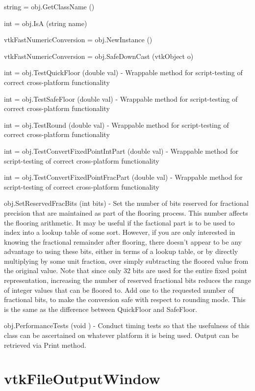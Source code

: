 \begin{DoxyItemize}
\item {\ttfamily string = obj.\-Get\-Class\-Name ()}  
\item {\ttfamily int = obj.\-Is\-A (string name)}  
\item {\ttfamily vtk\-Fast\-Numeric\-Conversion = obj.\-New\-Instance ()}  
\item {\ttfamily vtk\-Fast\-Numeric\-Conversion = obj.\-Safe\-Down\-Cast (vtk\-Object o)}  
\item {\ttfamily int = obj.\-Test\-Quick\-Floor (double val)} -\/ Wrappable method for script-\/testing of correct cross-\/platform functionality  
\item {\ttfamily int = obj.\-Test\-Safe\-Floor (double val)} -\/ Wrappable method for script-\/testing of correct cross-\/platform functionality  
\item {\ttfamily int = obj.\-Test\-Round (double val)} -\/ Wrappable method for script-\/testing of correct cross-\/platform functionality  
\item {\ttfamily int = obj.\-Test\-Convert\-Fixed\-Point\-Int\-Part (double val)} -\/ Wrappable method for script-\/testing of correct cross-\/platform functionality  
\item {\ttfamily int = obj.\-Test\-Convert\-Fixed\-Point\-Frac\-Part (double val)} -\/ Wrappable method for script-\/testing of correct cross-\/platform functionality  
\item {\ttfamily obj.\-Set\-Reserved\-Frac\-Bits (int bits)} -\/ Set the number of bits reserved for fractional precision that are maintained as part of the flooring process. This number affects the flooring arithmetic. It may be useful if the factional part is to be used to index into a lookup table of some sort. However, if you are only interested in knowing the fractional remainder after flooring, there doesn't appear to be any advantage to using these bits, either in terms of a lookup table, or by directly multiplying by some unit fraction, over simply subtracting the floored value from the original value. Note that since only 32 bits are used for the entire fixed point representation, increasing the number of reserved fractional bits reduces the range of integer values that can be floored to. Add one to the requested number of fractional bits, to make the conversion safe with respect to rounding mode. This is the same as the difference between Quick\-Floor and Safe\-Floor.  
\item {\ttfamily obj.\-Performance\-Tests (void )} -\/ Conduct timing tests so that the usefulness of this class can be ascertained on whatever platform it is being used. Output can be retrieved via Print method.  
\end{DoxyItemize}\hypertarget{vtkcommon_vtkfileoutputwindow}{}\section{vtk\-File\-Output\-Window}\label{vtkcommon_vtkfileoutputwindow}
